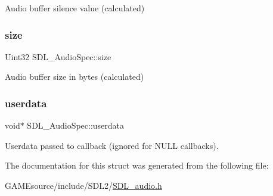 Audio buffer silence value (calculated) \mbox{\label{struct_s_d_l___audio_spec_a154cf44743ecec78c36dc6c827dd2fdb}} 
\subsubsection{\texorpdfstring{size}{size}}
{\footnotesize\ttfamily Uint32 S\+D\+L\+\_\+\+Audio\+Spec\+::size}

Audio buffer size in bytes (calculated) \mbox{\label{struct_s_d_l___audio_spec_aeec9481666f5f0982c98d3878f175d9b}} 
\subsubsection{\texorpdfstring{userdata}{userdata}}
{\footnotesize\ttfamily void$\ast$ S\+D\+L\+\_\+\+Audio\+Spec\+::userdata}

Userdata passed to callback (ignored for N\+U\+LL callbacks). 

The documentation for this struct was generated from the following file\+:\begin{DoxyCompactItemize}
\item 
G\+A\+M\+Esource/include/\+S\+D\+L2/\mbox{\hyperlink{_s_d_l__audio_8h}{S\+D\+L\+\_\+audio.\+h}}\end{DoxyCompactItemize}
